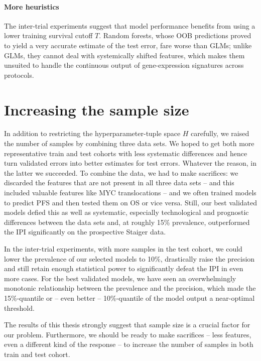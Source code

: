 \paragraph{More heuristics}

The inter-trial experiments suggest that model performance benefits from using a lower training 
survival cutoff $T$. Random forests, whose OOB predictions proved to yield a very accurate estimate 
of the test error, fare worse than GLMs; unlike GLMs, they cannot deal with systemically shifted 
features, which makes them unsuited to handle the continuous output of gene-expression signatures
across protocols.

\section{Increasing the sample size}

In addition to restricting the hyperparameter-tuple space $H$ carefully, we raised the number of 
samples by combining three data sets. We hoped to get both more representative train and test 
cohorts with less systematic differences and hence turn validated errors into better estimates 
for test errors. Whatever the reason, in the latter we succeeded. To combine the data, we had to 
make sacrifices: we discarded the features that are 
not present in all three data sets -- and this included valuable features like MYC translocations -- 
and we often trained models to predict PFS and then tested them on OS or vice versa. Still, our 
best validated models defied this as well as systematic, especially technological and prognostic 
differences between the data sets and, at roughly \num{15}\% prevalence, outperformed the IPI 
significantly on the prospective Staiger data.

In the inter-trial experiments, with more samples in the test cohort, we could lower the prevalence 
of our selected models to \num{10}\%, drastically raise the precision and still retain enough 
statistical power to significantly defeat the IPI in even more cases. For the best validated models, 
we have seen an overwhelmingly monotonic relationship between the prevalence and the precision, 
which made the \num{15}\%-quantile or -- even better -- \num{10}\%-quantile of the model output a 
near-optimal threshold. 

The results of this thesis strongly suggest that sample size is a crucial factor 
for our problem. Furthermore, we should be ready to make sacrifices -- less features, 
even a different kind of the response -- to increase the number of samples in both train and test 
cohort. 

